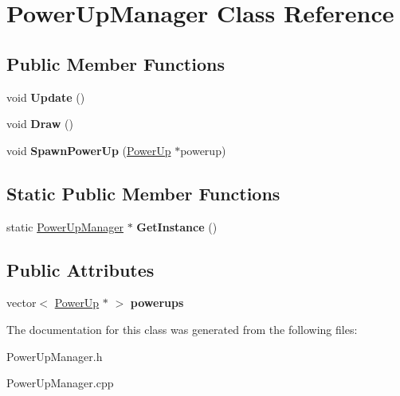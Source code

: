 \hypertarget{class_power_up_manager}{}\section{Power\+Up\+Manager Class Reference}
\label{class_power_up_manager}
\subsection*{Public Member Functions}
\begin{DoxyCompactItemize}
\item 
void {\bfseries Update} ()\hypertarget{class_power_up_manager_a5aa54767cacb7f7ef6bb7d46db1d2b43}{}\label{class_power_up_manager_a5aa54767cacb7f7ef6bb7d46db1d2b43}

\item 
void {\bfseries Draw} ()\hypertarget{class_power_up_manager_a7d883dd53e4516faf11f40d6ed9acb0b}{}\label{class_power_up_manager_a7d883dd53e4516faf11f40d6ed9acb0b}

\item 
void {\bfseries Spawn\+Power\+Up} (\hyperlink{class_power_up}{Power\+Up} $\ast$powerup)\hypertarget{class_power_up_manager_a474d28411b70c9f0b1dad29a1006229b}{}\label{class_power_up_manager_a474d28411b70c9f0b1dad29a1006229b}

\end{DoxyCompactItemize}
\subsection*{Static Public Member Functions}
\begin{DoxyCompactItemize}
\item 
static \hyperlink{class_power_up_manager}{Power\+Up\+Manager} $\ast$ {\bfseries Get\+Instance} ()\hypertarget{class_power_up_manager_a5b677e96037d4debcb627a743d16db2c}{}\label{class_power_up_manager_a5b677e96037d4debcb627a743d16db2c}

\end{DoxyCompactItemize}
\subsection*{Public Attributes}
\begin{DoxyCompactItemize}
\item 
vector$<$ \hyperlink{class_power_up}{Power\+Up} $\ast$ $>$ {\bfseries powerups}\hypertarget{class_power_up_manager_afee7d69e407c4a2f1118fe4bdafd5bc8}{}\label{class_power_up_manager_afee7d69e407c4a2f1118fe4bdafd5bc8}

\end{DoxyCompactItemize}


The documentation for this class was generated from the following files\+:\begin{DoxyCompactItemize}
\item 
Power\+Up\+Manager.\+h\item 
Power\+Up\+Manager.\+cpp\end{DoxyCompactItemize}
